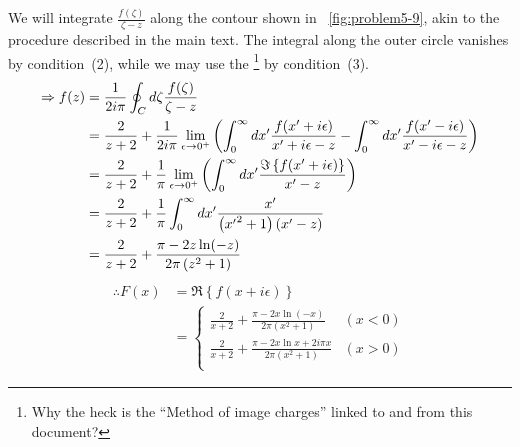 We will integrate $\frac{f(\zeta)}{\zeta - z}$ along the contour
shown in ~\ref{fig:problem5-9}, akin to the procedure described in the main text.
The integral along the outer circle vanishes by condition~(2),
while we may use the
%
\footnote{Why the heck is the ``Method of image charges'' linked to and from this document?}
by condition~(3).
\begin{align*}
    \Rightarrow f(z)
    &= \frac{1}{2i\pi} \oint_C d\zeta \frac{f(\zeta)}{\zeta - z} \\
    &= \frac{2}{z + 2} + \frac{1}{2i\pi} \lim_{\epsilon \rightarrow 0^+} \left(
        \int_0^\infty dx' \frac{f(x' + i\epsilon)}{x' + i\epsilon - z}
        - \int_0^\infty dx' \frac{f(x' - i\epsilon)}{x' - i\epsilon - z}
    \right) \\
    &= \frac{2}{z + 2} + \frac{1}{\pi} \lim_{\epsilon \rightarrow 0^+} \left(
        \int_0^\infty dx' \frac{\Im\left\{ f(x' + i\epsilon) \right\}}{x' - z}
    \right) \\
    &= \frac{2}{z + 2}
     + \frac{1}{\pi} \int_0^\infty dx' \frac{x'}{\left( {x'}^2 + 1 \right) (x' - z)} \\
    &= \frac{2}{z + 2} + \frac{\pi - 2z \ln(-z)}{2\pi \left( z^2 + 1 \right)}
\end{align*}
\begin{align*}
    \therefore F(x)
    &= \Re\left\{ f(x + i\epsilon) \right\} \\
    &= \begin{cases}
        \frac{2}{x + 2} + \frac{\pi - 2x\ln(-x)}{2\pi\left( x^2 + 1 \right)}         & (x < 0) \\
        \frac{2}{x + 2} + \frac{\pi - 2x\ln x + 2i\pi x}{2\pi\left( x^2 + 1 \right)} & (x > 0) \\
    \end{cases}
\end{align*}
